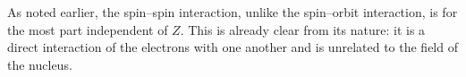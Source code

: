 As noted earlier, the spin--spin interaction, unlike the spin--orbit interaction, is for the most part independent of $Z$. This is already clear from its nature: it is a direct interaction of the electrons with one another and is unrelated to the field of the nucleus.
